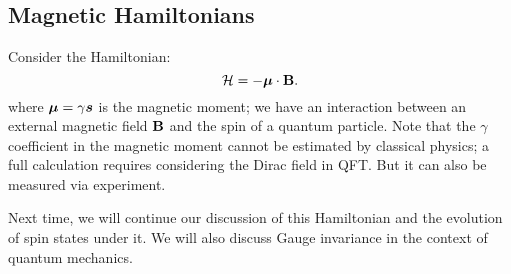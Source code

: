 \subsection{Magnetic Hamiltonians}
Consider the Hamiltonian:
\begin{equation}
    \mathcal{H} = -\mbox{\boldmath$ \mu $} \cdot \mathbf{B}.
\end{equation}
where $\mbox{\boldmath$ \mu $} = \gamma \mbox{\boldmath$ s $}$ is the magnetic moment; we have an interaction between an external magnetic field $\mathbf{B}$ and the spin of a quantum particle. Note that the $\gamma$ coefficient in the magnetic moment cannot be estimated by classical physics; a full calculation requires considering the Dirac field in QFT. But it can also be measured via experiment.

Next time, we will continue our discussion of this Hamiltonian and the evolution of spin states under it. We will also discuss Gauge invariance in the context of quantum mechanics.

